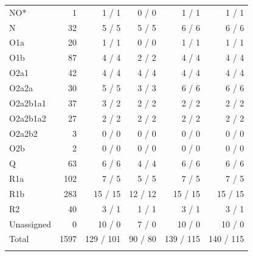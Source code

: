 \begin{table}[p]
\begin{tabular}{lrrrrr}
NO* & 1 & 1 / 1 & 0 / 0 & 1 / 1 & 1 / 1 \\
N & 32 & 5 / 5 & 5 / 5 & 6 / 6 & 6 / 6 \\
O1a & 20 & 1 / 1 & 0 / 0 & 1 / 1 & 1 / 1 \\
O1b & 87 & 4 / 4 & 2 / 2 & 4 / 4 & 4 / 4 \\
O2a1 & 42 & 4 / 4 & 4 / 4 & 4 / 4 & 4 / 4 \\
O2a2a & 30 & 5 / 5 & 3 / 3 & 6 / 6 & 6 / 6 \\
O2a2b1a1 & 37 & 3 / 2 & 2 / 2 & 2 / 2 & 2 / 2 \\
O2a2b1a2 & 27 & 2 / 2 & 2 / 2 & 2 / 2 & 2 / 2 \\
O2a2b2 & 3 & 0 / 0 & 0 / 0 & 0 / 0 & 0 / 0 \\
O2b & 2 & 0 / 0 & 0 / 0 & 0 / 0 & 0 / 0 \\
Q & 63 & 6 / 6 & 4 / 4 & 6 / 6 & 6 / 6 \\
R1a & 102 & 7 / 5 & 5 / 5 & 7 / 5 & 7 / 5 \\
R1b & 283 & 15 / 15 & 12 / 12 & 15 / 15 & 15 / 15 \\
R2 & 40 & 3 / 1 & 1 / 1 & 3 / 1 & 3 / 1 \\
Unassigned & 0 & 10 / 0 & 7 / 0 & 10 / 0 & 10 / 0 \\
\midrule
Total & 1597 & 129 / 101 & 90 / 80 & 139 / 115 & 140 / 115 \\
\botrule
\end{tabular}
\end{table}
